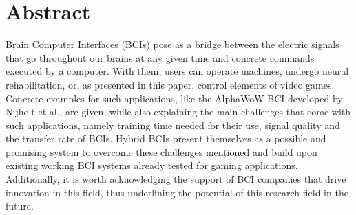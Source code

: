 %
\chapter*{Abstract}
\label{sec:abstract}
\vspace*{-10mm}

Brain Computer Interfaces (BCIs) pose as a bridge between the electric signals that go throughout our brains at any given time and concrete commands executed by a computer. With them, users can operate machines, undergo neural rehabilitation, or, as presented in this paper, control elements of video games. Concrete examples for such applications, like the AlphaWoW BCI developed by Nijholt et al., are given, while also explaining the main challenges that come with such applications, namely training time needed for their use, signal quality and the transfer rate of BCIs. %
Hybrid BCIs present themselves as a possible and promising system to overcome these challenges mentioned and build upon existing working BCI systems already tested for gaming applications.
Additionally, it is worth acknowledging the support of BCI companies that drive innovation in this field, thus underlining the potential of this research field in the future.
